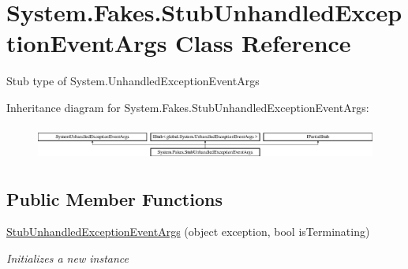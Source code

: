 \hypertarget{class_system_1_1_fakes_1_1_stub_unhandled_exception_event_args}{\section{System.\-Fakes.\-Stub\-Unhandled\-Exception\-Event\-Args Class Reference}
\label{class_system_1_1_fakes_1_1_stub_unhandled_exception_event_args}
}


Stub type of System.\-Unhandled\-Exception\-Event\-Args 


Inheritance diagram for System.\-Fakes.\-Stub\-Unhandled\-Exception\-Event\-Args\-:\begin{figure}[H]
\begin{center}
\leavevmode
\includegraphics[height=1.138211cm]{class_system_1_1_fakes_1_1_stub_unhandled_exception_event_args}
\end{center}
\end{figure}
\subsection*{Public Member Functions}
\begin{DoxyCompactItemize}
\item 
\hyperlink{class_system_1_1_fakes_1_1_stub_unhandled_exception_event_args_a34e0ac0008f75538d12f1deaaeca4409}{Stub\-Unhandled\-Exception\-Event\-Args} (object exception, bool is\-Terminating)
\begin{DoxyCompactList}\small\item\em Initializes a new instance\end{DoxyCompactList}\end{DoxyCompactItemize}

